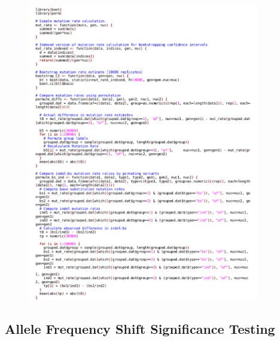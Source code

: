 \documentclass[12pt,twoside]{reedthesis}
\begin{document}
\begin{figure}[h!]
\includegraphics[width=0.9\textwidth]{../appendix_code/mutation_rate.png}
\end{figure}

\subsection{Allele Frequency Shift Significance Testing}
\end{document}
